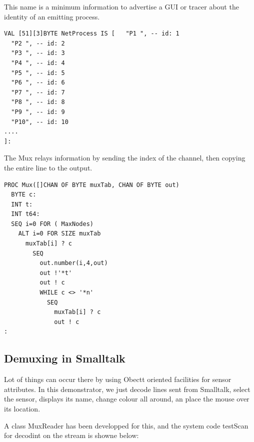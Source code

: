 This name is a minimum information to advertise a GUI or tracer about the identity 
of an emitting process. 

\begin{lstlisting} 
VAL [51][3]BYTE NetProcess IS [   "P1 ", -- id: 1
  "P2 ", -- id: 2
  "P3 ", -- id: 3
  "P4 ", -- id: 4
  "P5 ", -- id: 5
  "P6 ", -- id: 6
  "P7 ", -- id: 7
  "P8 ", -- id: 8
  "P9 ", -- id: 9
  "P10", -- id: 10
....
]:
 \end{lstlisting}

The Mux relays information by sending the index of the channel, then copying the entire line to the
output.
 

\begin{lstlisting}
PROC Mux([]CHAN OF BYTE muxTab, CHAN OF BYTE out)
  BYTE c: 
  INT t:
  INT t64: 
  SEQ i=0 FOR ( MaxNodes)
    ALT i=0 FOR SIZE muxTab
      muxTab[i] ? c
        SEQ 
          out.number(i,4,out) 
          out !'*t'
          out ! c
          WHILE c <> '*n'
            SEQ
              muxTab[i] ? c
              out ! c
:
 \end{lstlisting}
\subsection {Demuxing in Smalltalk }

Lot of things can occur there by using Obectt oriented facilities for sensor attributes. In this demonstrator, 
we just decode lines sent from Smalltalk, select the sensor, displays its name, change colour all around,
an place the mouse over its location.

A class MuxReader has been developped for this, and the system code testScan  for decodint on the stream is showne below:




